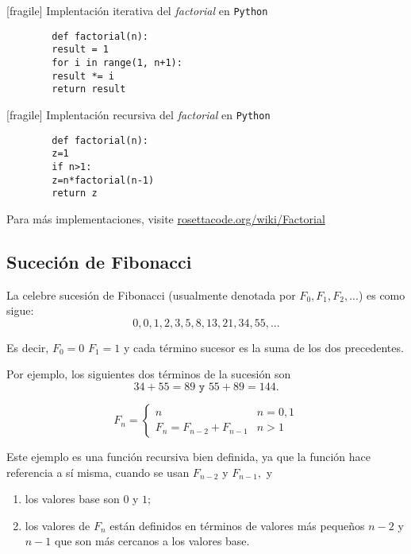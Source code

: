 [fragile]
	{Implentaci\'on iterativa del \emph{factorial} en \texttt{Python}}
	\begin{verbatim}
		def factorial(n):
		result = 1
		for i in range(1, n+1):
		result *= i
		return result
	\end{verbatim} 


[fragile]
	{Implentaci\'on recursiva del \emph{factorial} en \texttt{Python}}
	\begin{verbatim}
		def factorial(n):
		z=1
		if n>1:
		z=n*factorial(n-1)
		return z
	\end{verbatim}
	Para m\'as implementaciones, visite \href{https://rosettacode.org/wiki/Factorial}{rosettacode.org/wiki/Factorial}



\subsection{Suceci\'on de Fibonacci}


	La celebre sucesi\'on de Fibonacci (usualmente denotada por $F_{0}, F_{1}, F_{2},...$) es como sigue:
	$$
	0,0,1,2,3,5,8,13,21,34,55,...
	$$
	
	Es decir, $F_{0}=0$  $F_{1}=1$ y cada t\'ermino sucesor es la suma de los dos precedentes.



	Por ejemplo, los siguientes dos t\'erminos de la sucesi\'on son
	$$34+55=89 \texttt{ y }55+89=144.$$



	\begin{defn}
		$$
		F_{n}=
		\begin{cases}
			n & n=0,1 \\
			F_{n}=F_{n-2}+F_{n-1} & n>1
		\end{cases}
		$$
	\end{defn}



	Este ejemplo es una funci\'on recursiva bien definida, ya que la funci\'on hace referencia a s\'i misma, cuando se usan $ F_{n-2}$ y $F_{n-1},$ y
	\begin{enumerate}
		\item los valores base son $0$ y $1;$
		\item los valores de $F_{n}$ est\'an definidos en t\'erminos de valores m\'as peque\~nos $n-2$ y $n-1$ que son m\'as cercanos a los valores base.
	\end{enumerate}
	


